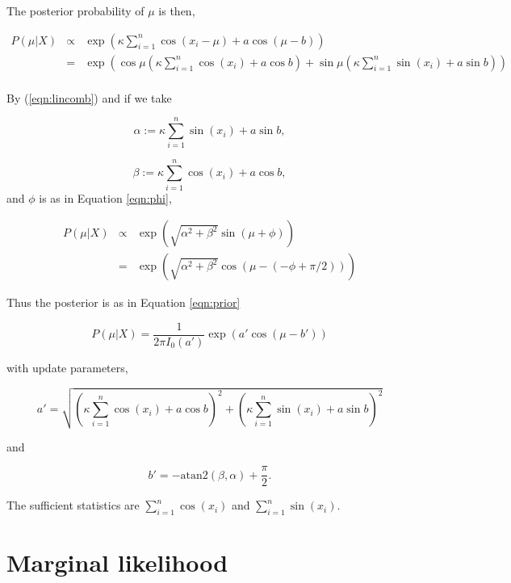 \documentclass[letterpaper,11pt]{article}
\begin{document}
	The posterior probability of $\mu$ is then,

	\begin{eqnarray}
		P(\mu|X) & \propto & \exp \left( \kappa \sum_{i=1}^n \cos(x_i-\mu) +  a \cos(\mu-b)\right)\\
		&=& \exp \left( \cos\mu \left( \kappa\sum_{i=1}^n \cos(x_i)+a\cos b\right) + \sin\mu \left( \kappa\sum_{i=1}^n \sin(x_i)+a\sin b\right)\right)\\
	\end{eqnarray}

	\noindent
	By (\ref{eqn:lincomb}) and if we take

	\begin{equation}
		\alpha := \kappa\sum_{i=1}^n \sin(x_i)+a\sin b,
	\end{equation}

	\begin{equation}
		\beta :=   \kappa\sum_{i=1}^n \cos(x_i)+a\cos b,
	\end{equation}
	\noindent
	and $\phi$ is as in Equation \ref{eqn:phi}, 

	\begin{eqnarray}
		P(\mu|X) & \propto & \exp \left(\sqrt{ \alpha^2 + \beta^2} \sin(\mu + \phi) \right)\\
		&=& \exp \left(\sqrt{ \alpha^2 + \beta^2} \cos(\mu - (-\phi + \pi/2)) \right)
	\end{eqnarray}


	\noindent
	Thus the posterior is as in Equation \ref{eqn:prior}

	\begin{equation}
		P(\mu|X) = \frac{1}{2\pi I_0(a')}\exp\left( a' \cos(\mu-b')\right)
	\end{equation}

	\noindent
	 with update parameters,

	
	\begin{equation}
		a' = \sqrt{ \left( \kappa\sum_{i=1}^n \cos(x_i)+a\cos b \right)^2 + \left( \kappa\sum_{i=1}^n \sin(x_i)+a\sin b \right)^2} 
	\end{equation}

	\noindent
	and

	\begin{equation}
		b' =   -\text{atan2}(\beta, \alpha) + \frac{\pi}{2}.
	\end{equation}


	\noindent
	The sufficient statistics are $\sum_{i=1}^n \cos(x_i)$ and $\sum_{i=1}^n \sin(x_i)$.


	\section{Marginal likelihood}
\end{document}
